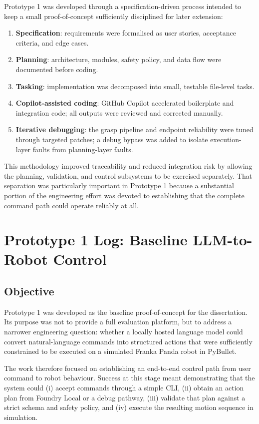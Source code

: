\documentclass[12pt,a4paper]{article}
\begin{document}
Prototype 1 was developed through a specification-driven process intended to keep a small proof-of-concept sufficiently disciplined for later extension:

\begin{enumerate}
\item \textbf{Specification}: requirements were formalised as user stories, acceptance criteria, and edge cases.
\item \textbf{Planning}: architecture, modules, safety policy, and data flow were documented before coding.
\item \textbf{Tasking}: implementation was decomposed into small, testable file-level tasks.
\item \textbf{Copilot-assisted coding}: GitHub Copilot accelerated boilerplate and integration code; all outputs were reviewed and corrected manually.
\item \textbf{Iterative debugging}: the grasp pipeline and endpoint reliability were tuned through targeted patches; a debug bypass was added to isolate execution-layer faults from planning-layer faults.
\end{enumerate}

This methodology improved traceability and reduced integration risk by allowing the planning, validation, and control subsystems to be exercised separately. That separation was particularly important in Prototype 1 because a substantial portion of the engineering effort was devoted to establishing that the complete command path could operate reliably at all.

\section{Prototype 1 Log: Baseline LLM-to-Robot Control}

\subsection{Objective}

Prototype 1 was developed as the baseline proof-of-concept for the dissertation. Its purpose was not to provide a full evaluation platform, but to address a narrower engineering question: whether a locally hosted language model could convert natural-language commands into structured actions that were sufficiently constrained to be executed on a simulated Franka Panda robot in PyBullet.

The work therefore focused on establishing an end-to-end control path from user command to robot behaviour. Success at this stage meant demonstrating that the system could (i) accept commands through a simple CLI, (ii) obtain an action plan from Foundry Local or a debug pathway, (iii) validate that plan against a strict schema and safety policy, and (iv) execute the resulting motion sequence in simulation.
\end{document}
